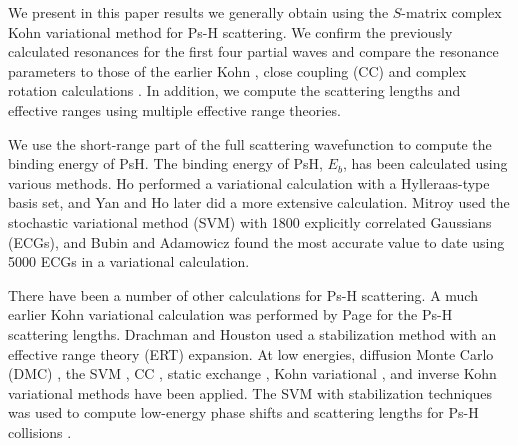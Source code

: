 \documentclass[preprint,showpacs,showkeys,preprintnumbers,amsmath,amssymb,longbibliography,pra,aps]{revtex4-1}
\begin{document}
We present in this paper results we generally obtain using the $S$-matrix
complex Kohn 
variational method for Ps-H scattering. We confirm the previously calculated 
resonances for the first four partial waves and compare the resonance parameters
to those of the earlier Kohn \cite{VanReeth2004}, close 
coupling (CC) \cite{Walters2004} and complex rotation calculations
\cite{Yan1999,Yan1998a,Ho1998,Ho2000}. In addition, we compute the scattering
lengths and effective ranges using multiple effective range theories.

We use the short-range part of the full scattering wavefunction to 
compute the binding energy of PsH. The binding energy
of PsH, $E_b$, has been calculated using various methods. Ho \cite{Ho1986}
performed a variational calculation with a Hylleraas-type basis set, and Yan and Ho
\cite{Yan1999} later did a more extensive calculation. Mitroy \cite{Mitroy2006}
used the stochastic variational method (SVM) with 1800 explicitly correlated 
Gaussians (ECGs), and Bubin and Adamowicz \cite{Bubin2006} found the most 
accurate value to date using 5000 ECGs in a variational calculation.

There have been a number of other calculations for Ps-H scattering. A much 
earlier Kohn variational calculation was performed by Page \cite{Page1976} 
for the Ps-H scattering lengths. Drachman and Houston
\cite{Drachman1975,Drachman1976} used
a stabilization method with an effective range theory (ERT) expansion.
At low energies, diffusion Monte Carlo (DMC)
\cite{Chiesa2002}, the SVM \cite{Ivanov2001,Ivanov2002}, CC
\cite{Sinha1997,Campbell1998,Adhikari1999,Sinha2000,Blackwood2002,Blackwood2002b,Walters2004},
static exchange \cite{Hara1975,Ray1997,*Ray1996}, Kohn variational
\cite{Page1976,VanReeth2003,VanReeth2004}, and inverse Kohn
variational \cite{VanReeth2003,VanReeth2004} methods have been applied. The SVM
with stabilization 
techniques was used to compute low-energy phase shifts and 
scattering lengths for Ps-H collisions \cite{Ivanov2001,Ivanov2002}.
\end{document}

